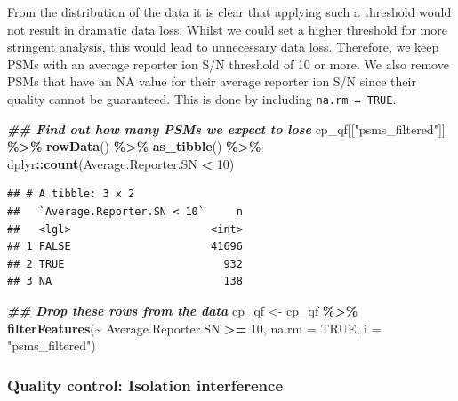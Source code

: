 \documentclass[9pt,a4paper,]{extarticle}
\newenvironment{Shaded}{\begin{snugshade}}{\end{snugshade}}
\newcommand{\AttributeTok}[1]{\textcolor[rgb]{0.13,0.29,0.53}{#1}}
\newcommand{\ConstantTok}[1]{\textcolor[rgb]{0.56,0.35,0.01}{#1}}
\newcommand{\DecValTok}[1]{\textcolor[rgb]{0.00,0.00,0.81}{#1}}
\newcommand{\DocumentationTok}[1]{\textcolor[rgb]{0.56,0.35,0.01}{\textbf{\textit{#1}}}}
\newcommand{\FunctionTok}[1]{\textcolor[rgb]{0.13,0.29,0.53}{\textbf{#1}}}
\newcommand{\NormalTok}[1]{#1}
\newcommand{\OtherTok}[1]{\textcolor[rgb]{0.56,0.35,0.01}{#1}}
\newcommand{\SpecialCharTok}[1]{\textcolor[rgb]{0.81,0.36,0.00}{\textbf{#1}}}
\newcommand{\StringTok}[1]{\textcolor[rgb]{0.31,0.60,0.02}{#1}}
\begin{document}
From the distribution of the data it is clear that applying such a threshold
would not result in dramatic data loss. Whilst we could set a higher threshold
for more stringent analysis, this would lead to unnecessary data loss.
Therefore, we keep PSMs with an average reporter ion S/N threshold of 10 or more.
We also remove PSMs that have an NA value for their average reporter ion
S/N since their quality cannot be guaranteed. This is done by including \texttt{na.rm\ =\ TRUE}.

\begin{Shaded}
\begin{Highlighting}[]
\DocumentationTok{\#\# Find out how many PSMs we expect to lose}
\NormalTok{cp\_qf[[}\StringTok{"psms\_filtered"}\NormalTok{]] }\SpecialCharTok{\%\textgreater{}\%} 
  \FunctionTok{rowData}\NormalTok{() }\SpecialCharTok{\%\textgreater{}\%} 
  \FunctionTok{as\_tibble}\NormalTok{() }\SpecialCharTok{\%\textgreater{}\%} 
\NormalTok{  dplyr}\SpecialCharTok{::}\FunctionTok{count}\NormalTok{(Average.Reporter.SN }\SpecialCharTok{\textless{}} \DecValTok{10}\NormalTok{)}
\end{Highlighting}
\end{Shaded}

\begin{verbatim}
## # A tibble: 3 x 2
##   `Average.Reporter.SN < 10`     n
##   <lgl>                      <int>
## 1 FALSE                      41696
## 2 TRUE                         932
## 3 NA                           138
\end{verbatim}

\begin{Shaded}
\begin{Highlighting}[]
\DocumentationTok{\#\# Drop these rows from the data}
\NormalTok{cp\_qf }\OtherTok{\textless{}{-}}\NormalTok{ cp\_qf }\SpecialCharTok{\%\textgreater{}\%}
  \FunctionTok{filterFeatures}\NormalTok{(}\SpecialCharTok{\textasciitilde{}}\NormalTok{ Average.Reporter.SN }\SpecialCharTok{\textgreater{}=} \DecValTok{10}\NormalTok{, }
                 \AttributeTok{na.rm =} \ConstantTok{TRUE}\NormalTok{,}
                 \AttributeTok{i =} \StringTok{"psms\_filtered"}\NormalTok{)}
\end{Highlighting}
\end{Shaded}

\subsubsection{Quality control: Isolation interference}\label{quality-control-isolation-interference}
\end{document}
